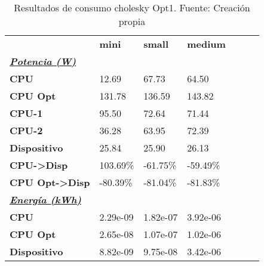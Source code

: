 \begin{table}[H]
    \centering
    \begin{tabular}{lllllll}
    \rowcolor[HTML]{DAE8FC} \ & \textbf{mini} & \textbf{	small} & \textbf{	medium} \\
    \cellcolor[HTML]{DAE8FC} \textbf{\textbf{{\emph{{\underline{{Potencia (W)}}}}}}} &  & 	 & 	 \\
    \rowcolor[HTML]{EFEFEF} \cellcolor[HTML]{DAE8FC} \textbf{CPU} & 12.69 & 	67.73 & 	64.50 \\
    \cellcolor[HTML]{DAE8FC} \textbf{CPU Opt} & 131.78 & 	136.59 & 	143.82 \\
    \rowcolor[HTML]{EFEFEF} \cellcolor[HTML]{DAE8FC} \textbf{\quad CPU-1} & 95.50 & 	72.64 & 	71.44 \\
    \cellcolor[HTML]{DAE8FC} \textbf{\quad CPU-2} & 36.28 & 	63.95 & 	72.39 \\
    \rowcolor[HTML]{EFEFEF} \cellcolor[HTML]{DAE8FC} \textbf{Dispositivo} & 25.84 & 	25.90 & 	26.13 \\
    \cellcolor[HTML]{DAE8FC} \textbf{CPU->Disp} & 103.69\% & 	-61.75\% & 	-59.49\% \\
    \rowcolor[HTML]{EFEFEF} \cellcolor[HTML]{DAE8FC} \textbf{CPU Opt->Disp} & -80.39\% & 	-81.04\% & 	-81.83\% \\
    \cellcolor[HTML]{DAE8FC} \textbf{\textbf{{\emph{{\underline{{Energía (kWh)}}}}}}} &  & 	 & 	 \\
    \rowcolor[HTML]{EFEFEF} \cellcolor[HTML]{DAE8FC} \textbf{CPU} & 2.29e-09 & 	1.82e-07 & 	3.92e-06 \\
    \cellcolor[HTML]{DAE8FC} \textbf{CPU Opt} & 2.65e-08 & 	1.07e-07 & 	1.02e-06 \\
    \rowcolor[HTML]{EFEFEF} \cellcolor[HTML]{DAE8FC} \textbf{Dispositivo} & 8.82e-09 & 	9.75e-08 & 	3.42e-06 \\
    \end{tabular}
    \caption[Resultados de consumo cholesky Opt1]{{Resultados de consumo cholesky Opt1. Fuente: Creación propia}}
    \label{table_test_cholesky_Opt1_hw_powerResults}
\end{table}
